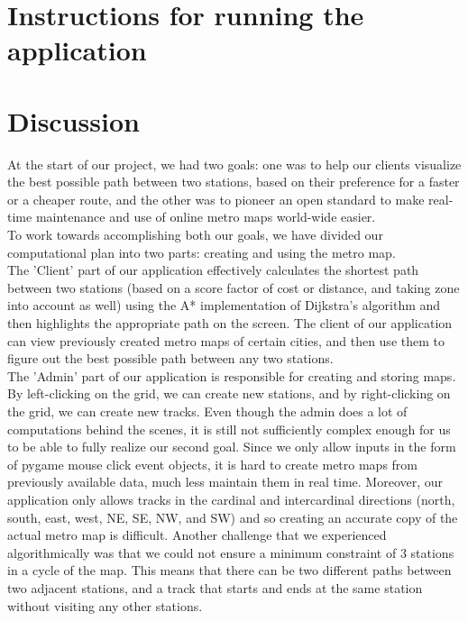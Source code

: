\documentclass[fontsize=11pt]{article}
\begin{document}
    \section*{Instructions for running the application}
    \section*{Discussion}
    At the start of our project, we had two goals: one was to help our clients visualize the best possible path between two stations, based on their preference for a faster or a cheaper route, and the other was to pioneer an open standard to make real-time maintenance and use of online metro maps world-wide easier. \\

To work towards accomplishing both our goals, we have divided our computational plan into two parts: creating and using the metro map. \\

The 'Client' part of our application effectively calculates the shortest path between two stations (based on a score factor of cost or distance, and taking zone into account as well) using the A* implementation of Dijkstra's algorithm and then highlights the appropriate path on the screen. The client of our application can view previously created metro maps of certain cities, and then use them to figure out the best possible path between any two stations.\\

The 'Admin' part of our application is responsible for creating and storing maps. By left-clicking on the grid, we can create new stations, and by right-clicking on the grid, we can create new tracks. Even though the admin does a lot of computations behind the scenes, it is still not sufficiently complex enough for us to be able to fully realize our second goal. Since we only allow inputs in the form of pygame mouse click event objects, it is hard to create metro maps from previously available data, much less maintain them in real time. Moreover, our application only allows tracks in the cardinal and intercardinal directions (north, south, east, west, NE, SE, NW, and SW) and so creating an accurate copy of the actual metro map is difficult. Another challenge that we experienced algorithmically was that we could not ensure a minimum constraint of 3 stations in a cycle of the map. This means that there can be two different paths between two adjacent stations, and a track that starts and ends at the same station without visiting any other stations. \\
\end{document}

